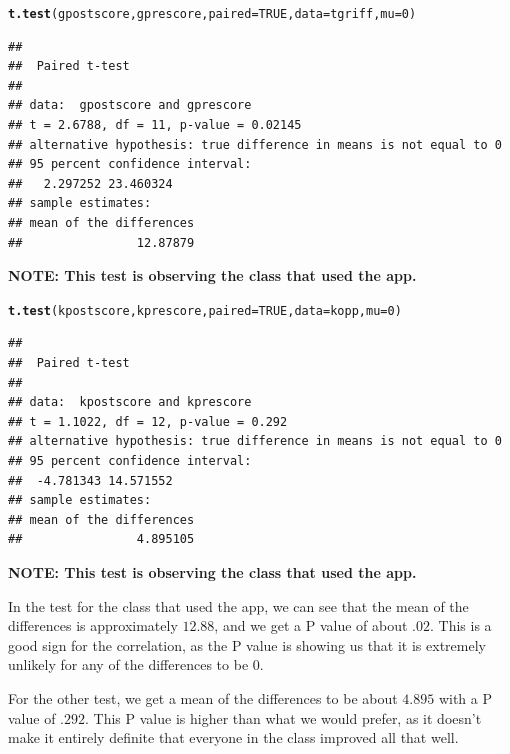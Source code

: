 \documentclass{article}\usepackage[]{graphicx}\usepackage[]{color}
\makeatletter
\newcommand{\hlnum}[1]{\textcolor[rgb]{0.686,0.059,0.569}{#1}}%
\newcommand{\hlstd}[1]{\textcolor[rgb]{0.345,0.345,0.345}{#1}}%
\newcommand{\hlkwc}[1]{\textcolor[rgb]{0.333,0.667,0.333}{#1}}%
\newcommand{\hlkwd}[1]{\textcolor[rgb]{0.737,0.353,0.396}{\textbf{#1}}}%
\newenvironment{kframe}{%
 \def\at@end@of@kframe{}%
 \ifinner\ifhmode%
  \def\at@end@of@kframe{\end{minipage}}%
  \begin{minipage}{\columnwidth}%
 \fi\fi%
 \def\FrameCommand##1{\hskip\@totalleftmargin \hskip-\fboxsep
 \colorbox{shadecolor}{##1}\hskip-\fboxsep
     \hskip-\linewidth \hskip-\@totalleftmargin \hskip\columnwidth}%
 \MakeFramed {\advance\hsize-\width
   \@totalleftmargin\z@ \linewidth\hsize
   \@setminipage}}%
 {\par\unskip\endMakeFramed%
 \at@end@of@kframe}
\newenvironment{knitrout}{}{} %
\makeatother
\begin{document}
\begin{knitrout}
\color{fgcolor}\begin{kframe}
\begin{alltt}
\hlkwd{t.test}\hlstd{(gpostscore,gprescore,} \hlkwc{paired} \hlstd{=} \hlnum{TRUE}\hlstd{,} \hlkwc{data} \hlstd{= tgriff,} \hlkwc{mu} \hlstd{=} \hlnum{0}\hlstd{)}
\end{alltt}
\begin{verbatim}
## 
## 	Paired t-test
## 
## data:  gpostscore and gprescore
## t = 2.6788, df = 11, p-value = 0.02145
## alternative hypothesis: true difference in means is not equal to 0
## 95 percent confidence interval:
##   2.297252 23.460324
## sample estimates:
## mean of the differences 
##                12.87879
\end{verbatim}
\end{kframe}
\end{knitrout}

\textbf{NOTE: This test is observing the class that used the app.}

\begin{knitrout}
\color{fgcolor}\begin{kframe}
\begin{alltt}
\hlkwd{t.test}\hlstd{(kpostscore,kprescore,} \hlkwc{paired} \hlstd{=} \hlnum{TRUE}\hlstd{,} \hlkwc{data} \hlstd{= kopp,} \hlkwc{mu} \hlstd{=} \hlnum{0}\hlstd{)}
\end{alltt}
\begin{verbatim}
## 
## 	Paired t-test
## 
## data:  kpostscore and kprescore
## t = 1.1022, df = 12, p-value = 0.292
## alternative hypothesis: true difference in means is not equal to 0
## 95 percent confidence interval:
##  -4.781343 14.571552
## sample estimates:
## mean of the differences 
##                4.895105
\end{verbatim}
\end{kframe}
\end{knitrout}

\textbf{NOTE: This test is observing the class that used the app.}

In the test for the class that used the app, we can see that the mean of the differences is approximately \(12.88\), and we get a P value of about \(.02\). This is a good sign for the correlation, as the P value is showing us that it is extremely unlikely for any of the differences to be \(0\). 

For the other test, we get a mean of the differences to be about \(4.895\) with a P value of \(.292\). This P value is higher than what we would prefer, as it doesn't make it entirely definite that everyone in the class improved all that well. 
\end{document}
